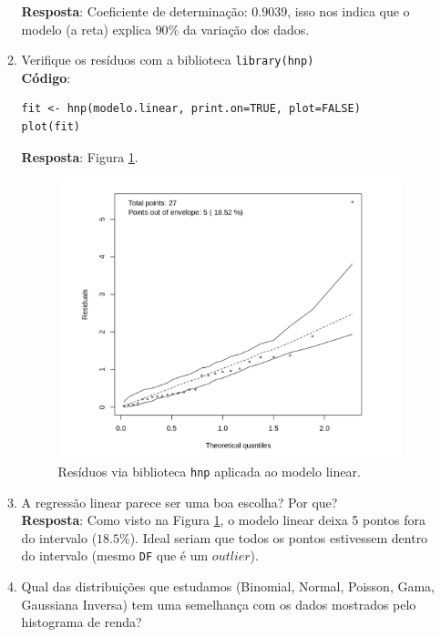 \documentclass[a4paper,12pt]{article}
\begin{document}
\begin{enumerate}
\begin{enumerate}
            \textbf{Resposta}: Coeficiente de determinação: $0.9039$, isso nos indica que o modelo (a reta) explica $90\%$ da variação dos dados.
        \item[1.9] Verifique os resíduos com a biblioteca \texttt{library(hnp)} \\
        \textbf{Código}:
            \begin{lstlisting}
fit <- hnp(modelo.linear, print.on=TRUE, plot=FALSE)
plot(fit)
            \end{lstlisting}
                \textbf{Resposta}: Figura \ref{fig2res}.
                \begin{figure}[h!tb]
                     \centering
                     \includegraphics[scale=0.45]{2_1e_res.png}
                     \caption{Resíduos via biblioteca \texttt{hnp} aplicada ao modelo linear.}
                     \label{fig2res}
                \end{figure}
        \item[1.10] A regressão linear parece ser uma boa escolha? Por que? \\
              \textbf{Resposta}: Como visto na Figura \ref{fig2res}, o modelo linear deixa 5 pontos fora do intervalo ($18.5\%$). Ideal seriam que todos os pontos estivessem dentro do intervalo (mesmo \texttt{DF} que é um $outlier$).
        \item[1.11] Qual das distribuições que estudamos (Binomial, Normal, Poisson, Gama, Gaussiana Inversa) tem uma semelhança com os dados mostrados pelo histograma de renda?  \\

\end{enumerate}
\end{enumerate}
\end{document}
